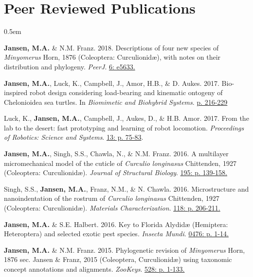 \documentclass[12pt,a4paper]{article}
\begin{document}
\section*{Peer Reviewed Publications}
	\begin{description}
		\itemsep0.5em
		\item \textbf{Jansen, M.A.} \& N.M. Franz. 2018. Descriptions of four new species of \textit{Minyomerus} Horn, 1876 (Coleoptera: Curculionid\ae), with notes on their distribution and phylogeny. \textit{PeerJ}. \href{https://peerj.com/articles/5633/}{6: e5633.}
		\item \textbf{Jansen, M.A.}, Luck, K., Campbell, J., Amor, H.B., \& D. Aukes. 2017. Bio-inspired robot design considering load-bearing and kinematic ontogeny of Chelonioidea sea turtles. In \textit{Biomimetic and Biohybrid Systems}. \href{http://www.springer.com/us/book/9783319635361}{p. 216-229}
		\item Luck, K., \textbf{Jansen, M.A.}, Campbell, J., Aukes, D., \& H.B. Amor. 2017. From the lab to the desert: fast prototyping and learning of robot locomotion. \textit{Proceedings of Robotics: Science and Systems}. \href{http://www.roboticsproceedings.org/rss13/p75.html}{13: p. 75-83}.
		\item \textbf{Jansen, M.A.}, Singh, S.S., Chawla, N., \& N.M. Franz. 2016. A multilayer micromechanical model of the cuticle of \textit{Curculio longinasus} Chittenden, 1927 (Coleoptera: Curculionid\ae). \textit{Journal of Structural Biology}. \href{http://www.sciencedirect.com/science/article/pii/S1047847716300922}{195: p. 139-158.}
		\item Singh, S.S., \textbf{Jansen, M.A.}, Franz, N.M., \& N. Chawla. 2016. Microstructure and nanoindentation of the rostrum of \textit{Curculio longinasus} Chittenden, 1927 (Coleoptera: Curculionid\ae). \textit{Materials Characterization}. \href{http://www.sciencedirect.com/science/article/pii/S1044580316301619}{118: p. 206-211.}
		\item \textbf{Jansen, M.A.} \& S.E. Halbert. 2016. Key to Florida Alydid{\ae} (Hemiptera: Heteroptera) and selected exotic pest species. \textit{Insecta Mundi}. \href{http://journals.fcla.edu/mundi/article/view/87952/84644}{0476: p. 1-14.}
		\item \textbf{Jansen, M.A.} \& N.M. Franz. 2015. Phylogenetic revision of \textit{Minyomerus} Horn, 1876 sec. Jansen \& Franz, 2015 (Coleoptera, Curculionid\ae) using taxonomic concept annotations and alignments. \textit{ZooKeys}. \href{http://zookeys.pensoft.net/articles.php?id=6001}{528: p. 1-133.}
	\end{description}
\end{document}
